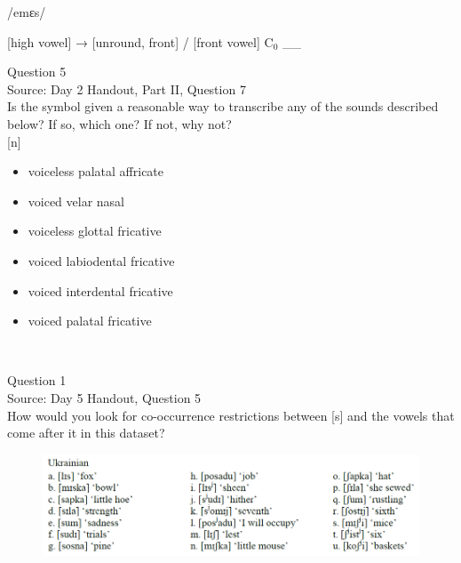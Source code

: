 \documentclass[12pt]{article}
\begin{document}
/emɛs/

{[high vowel]} →  {[unround, front]} / {[front vowel]} C$_0$ \_\_ 


\newpage

{\large Question 5}\\

Source: Day 2 Handout, Part II, Question 7\\

Is the symbol given a reasonable way to transcribe any of the sounds described below? If so, which one? If not, why not?\\

{[n]}

\begin{itemize} \item voiceless palatal affricate \item voiced velar nasal \item voiceless glottal fricative \item voiced labiodental fricative \item voiced interdental fricative \item voiced palatal fricative \end{itemize}


\newpage

\begin{center}
\textbf{{\color{red}{\HUGE END OF EXAM}}}\\

\end{center}
\newpage

\begin{center}
\textbf{{\color{blue}{\HUGE START OF EXAM\\}}}

\textbf{{\color{blue}{\HUGE Student ID: 3420\\}}}

\textbf{{\color{blue}{\HUGE 3:00 - 3:15 PM\\}}}

\end{center}
\newpage

{\large Question 1}\\

Source: Day 5 Handout, Question 5\\

How would you look for co-occurrence restrictions between [s] and the vowels that come after it in this dataset?\\

\begin{figure}[H]
\includegraphics{../images/ukrainian.png}
\end{figure}
\end{document}
